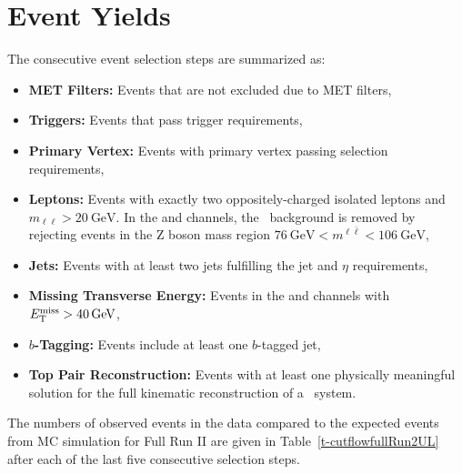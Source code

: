 \section{Event Yields}
The consecutive event selection steps are summarized as:
\begin{itemize}
    \item {\bf MET Filters:} Events that are not excluded due to MET filters,
    \item {\bf Triggers:} Events that pass trigger requirements,
    \item {\bf Primary Vertex:} Events with primary vertex passing selection requirements,
    \item {\bf Leptons:} Events with exactly two oppositely-charged isolated leptons and $m_{\ell\ell} > \SI{20}{\GeV}$.  
            In the \mumu and \ee channels, the \zjets\ background is removed by rejecting events in the Z boson mass region $\SI{76}{\GeV} < m^{\ell\bar{\ell}} < \SI{106}{\GeV}$,
    \item {\bf Jets:} Events with at least two jets fulfilling the jet \pT and $\eta$ requirements,
    \item {\bf Missing Transverse Energy:} Events in the \mumu and \ee channels with $\ETmiss > \SI{40}{\GeV}$,
    \item {\bf $b$-Tagging:} Events include at least one $b$-tagged jet,
    \item {\bf Top Pair Reconstruction:} Events with at least one physically meaningful solution for the full kinematic reconstruction of a \ttbar\ system.
\end{itemize}
The numbers of observed events in the data compared to the expected events from MC simulation for Full Run II are given in Table~\ref{t-cutflowfullRun2UL} after each of the last five consecutive selection steps.

